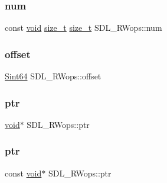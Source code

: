 \subsubsection{\texorpdfstring{num}{num}}
{\footnotesize\ttfamily const \hyperlink{_s_d_l__opengles2__gl2ext_8h_ae5d8fa23ad07c48bb609509eae494c95}{void} \hyperlink{_s_d_l__config_8h_a7c94ea6f8948649f8d181ae55911eeaf}{size\+\_\+t} \hyperlink{_s_d_l__config_8h_a7c94ea6f8948649f8d181ae55911eeaf}{size\+\_\+t} S\+D\+L\+\_\+\+R\+Wops\+::num}

\mbox{\label{struct_s_d_l___r_wops_ab1ee9d9e4f61b3b30f26160c282ae416}} 
\subsubsection{\texorpdfstring{offset}{offset}}
{\footnotesize\ttfamily \hyperlink{_s_d_l__stdinc_8h_a2c1a61d5c466bb74680be0a8cc1b455d}{Sint64} S\+D\+L\+\_\+\+R\+Wops\+::offset}

\mbox{\label{struct_s_d_l___r_wops_a3f68b93789331775de802d51a2934f0a}} 
\subsubsection{\texorpdfstring{ptr}{ptr}\hspace{0.1cm}{\footnotesize\ttfamily [1/2]}}
{\footnotesize\ttfamily \hyperlink{_s_d_l__opengles2__gl2ext_8h_ae5d8fa23ad07c48bb609509eae494c95}{void}$\ast$ S\+D\+L\+\_\+\+R\+Wops\+::ptr}

\mbox{\label{struct_s_d_l___r_wops_a51baff579726790887a4ca41ce14873c}} 
\subsubsection{\texorpdfstring{ptr}{ptr}\hspace{0.1cm}{\footnotesize\ttfamily [2/2]}}
{\footnotesize\ttfamily const \hyperlink{_s_d_l__opengles2__gl2ext_8h_ae5d8fa23ad07c48bb609509eae494c95}{void}$\ast$ S\+D\+L\+\_\+\+R\+Wops\+::ptr}

